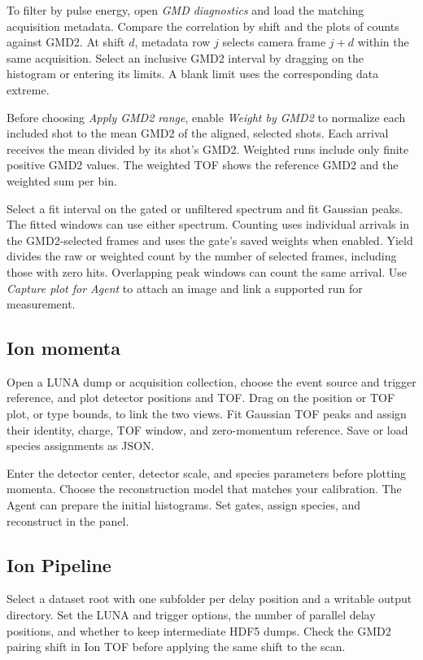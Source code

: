 \documentclass[11pt,a4paper]{article}
\begin{document}
To filter by pulse energy, open \emph{GMD diagnostics} and load the matching
acquisition metadata. Compare the correlation by shift and the plots of
counts against GMD2. At shift $d$, metadata row $j$ selects camera frame
$j+d$ within the same acquisition. Select an inclusive GMD2 interval by
dragging on the histogram or entering its limits. A blank limit uses the
corresponding data extreme.

Before choosing \emph{Apply GMD2 range}, enable \emph{Weight by GMD2} to
normalize each included shot to the mean GMD2 of the aligned, selected
shots. Each arrival receives the mean divided by its shot's GMD2. Weighted
runs include only finite positive GMD2 values. The weighted TOF shows the
reference GMD2 and the weighted sum per bin.

Select a fit interval on the gated or unfiltered spectrum and fit Gaussian
peaks. The fitted windows can use either spectrum. Counting uses individual
arrivals in the GMD2-selected frames and uses the gate's saved weights when
enabled. Yield divides the raw or weighted count by the number of selected
frames, including those with zero hits. Overlapping peak windows can count
the same arrival.
Use \emph{Capture plot for Agent} to attach an image and link a supported run
for measurement.

\subsection{Ion momenta}

Open a LUNA dump or acquisition collection, choose the event source and
trigger reference, and plot detector positions and TOF. Drag on the
position or TOF plot, or type bounds, to link the two views. Fit Gaussian
TOF peaks and assign their identity, charge, TOF window, and zero-momentum
reference. Save or load species assignments as JSON.

Enter the detector center, detector scale, and species parameters before
plotting momenta. Choose the reconstruction model that matches your
calibration. The Agent can prepare the initial histograms. Set gates,
assign species, and reconstruct in the panel.

\subsection{Ion Pipeline}

Select a dataset root with one subfolder per delay position and a writable
output directory. Set the LUNA and trigger options, the number of parallel
delay positions, and whether to keep intermediate HDF5 dumps. Check the
GMD2 pairing shift in Ion TOF before applying the same shift to the scan.
\end{document}
